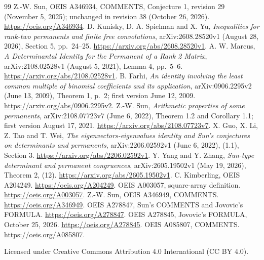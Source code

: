 \documentclass[11pt]{article}
\begin{document}
\begin{thebibliography}{99}
 Z.-W. Sun, OEIS A346934, COMMENTS, Conjecture 1,
revision 29 (November 5, 2025); unchanged in revision 38
(October 26, 2026). \url{https://oeis.org/A346934}.
 D. Kunisky, D. A. Spielman and X. Yu,
\emph{Inequalities for rank-two permanents and finite free convolutions},
arXiv:2608.28520v1 (August 28, 2026), Section 5, pp.~24--25.
\url{https://arxiv.org/abs/2608.28520v1}.
 A. W. Marcus,
\emph{A Determinantal Identity for the Permanent of a Rank 2 Matrix},
arXiv:2108.02528v1 (August 5, 2021), Lemma 4, pp.~5--6.
\url{https://arxiv.org/abs/2108.02528v1}.
 B. Farhi,
\emph{An identity involving the least common multiple of binomial
coefficients and its application}, arXiv:0906.2295v2 (June 13, 2009),
Theorem 1, p.~2; first version June 12, 2009.
\url{https://arxiv.org/abs/0906.2295v2}.
 Z.-W. Sun, \emph{Arithmetic properties of some permanents},
arXiv:2108.07723v7 (June 6, 2022), Theorem 1.2 and Corollary 1.1;
first version August 17, 2021.
\url{https://arxiv.org/abs/2108.07723v7}.
 X. Guo, X. Li, Z. Tao and T. Wei,
\emph{The eigenvectors-eigenvalues identity and Sun's conjectures on
determinants and permanents}, arXiv:2206.02592v1 (June 6, 2022),
(1.1), Section 3.
\url{https://arxiv.org/abs/2206.02592v1}.
 Y. Yang and Y. Zhang,
\emph{Sun-type determinant and permanent congruences},
arXiv:2605.19502v1 (May 19, 2026), Theorem 2, (12).
\url{https://arxiv.org/abs/2605.19502v1}.
 C. Kimberling, OEIS A204249.
\url{https://oeis.org/A204249}.
 OEIS A003057, square-array definition.
\url{https://oeis.org/A003057}.
 Z.-W. Sun, OEIS A346949, COMMENTS.
\url{https://oeis.org/A346949}.
 OEIS A278847, Sun's COMMENTS and Jovovic's FORMULA.
\url{https://oeis.org/A278847}.
 OEIS A278845, Jovovic's FORMULA, October 25, 2026.
\url{https://oeis.org/A278845}.
 OEIS A085807, COMMENTS.
\url{https://oeis.org/A085807}.
\end{thebibliography}
\noindent\small Licensed under Creative Commons Attribution 4.0
International (CC BY 4.0).
\end{document}

